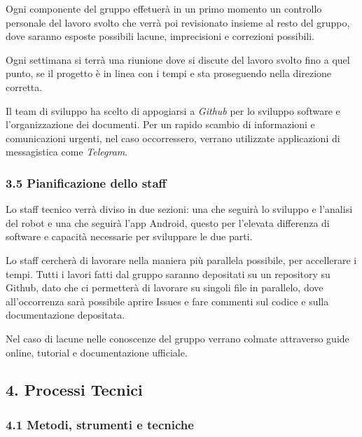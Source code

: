\documentclass[]{article}
\begin{document}
Ogni componente del gruppo effetuerà in un primo momento un controllo
personale del lavoro svolto che verrà poi revisionato insieme al resto
del gruppo, dove saranno esposte possibili lacune, imprecisioni e
correzioni possibili.

Ogni settimana si terrà una riunione dove si discute del lavoro svolto
fino a quel punto, se il progetto è in linea con i tempi e sta
proseguendo nella direzione corretta.

Il team di sviluppo ha scelto di appogiarsi a \emph{Github} per lo
sviluppo software e l'organizzazione dei documenti. Per un rapido
scambio di informazioni e comunicazioni urgenti, nel caso occorressero,
verrano utilizzate applicazioni di messagistica come \emph{Telegram}.

\hypertarget{pianificazione-dello-staff}{%
\subsubsection{3.5 Pianificazione dello
staff}\label{pianificazione-dello-staff}}

Lo staff tecnico verrà diviso in due sezioni: una che seguirà lo
sviluppo e l'analisi del robot e una che seguirà l'app Android, questo
per l'elevata differenza di software e capacità necessarie per
sviluppare le due parti.

Lo staff cercherà di lavorare nella maniera più parallela possibile, per
accellerare i tempi. Tutti i lavori fatti dal gruppo saranno depositati
su un repository su Github, dato che ci permetterà di lavorare su
singoli file in parallelo, dove all'occorrenza sarà possibile aprire
Issues e fare commenti sul codice e sulla documentazione depositata.

Nel caso di lacune nelle conoscenze del gruppo verrano colmate
attraverso guide online, tutorial e documentazione ufficiale.

\hypertarget{processi-tecnici}{%
\subsection{4. Processi Tecnici}\label{processi-tecnici}}

\hypertarget{metodi-strumenti-e-tecniche}{%
\subsubsection{4.1 Metodi, strumenti e
tecniche}\label{metodi-strumenti-e-tecniche}}
\end{document}
